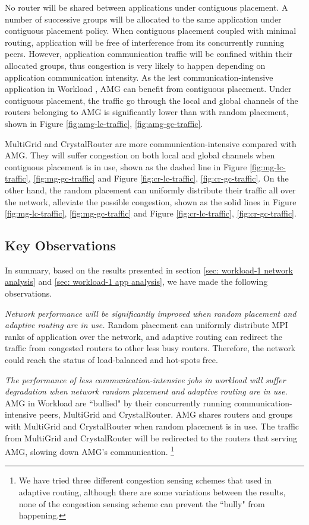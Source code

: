 No router will be shared between applications under contiguous placement. A number of successive groups will be allocated to the same application under contiguous placement policy. When contiguous placement coupled with minimal routing, application will be free of interference from its concurrently running peers. However, application communication traffic will be confined within their allocated groups, thus congestion is very likely to happen depending on application communication intensity. As the lest communication-intensive application in Workload , AMG can benefit from contiguous placement. Under contiguous placement, the traffic go through the local and global channels of the routers belonging to AMG is significantly lower than with random placement, shown in Figure \ref{fig:amg-lc-traffic}, \ref{fig:amg-gc-traffic}. 

MultiGrid and CrystalRouter are more communication-intensive compared with AMG. They will suffer congestion on both local and global channels when contiguous placement is in use, shown as the dashed line in Figure \ref{fig:mg-lc-traffic}, \ref{fig:mg-gc-traffic} and Figure \ref{fig:cr-lc-traffic}, \ref{fig:cr-gc-traffic}. On the other hand, the random placement can uniformly distribute their traffic all over the network, alleviate the possible congestion, shown as the solid lines in Figure \ref{fig:mg-lc-traffic}, \ref{fig:mg-gc-traffic} and Figure \ref{fig:cr-lc-traffic}, \ref{fig:cr-gc-traffic}.


\subsection{Key Observations}
In summary, based on the results presented in section \ref{sec: workload-1 network analysis} and \ref{sec: workload-1 app analysis}, we have made the following observations.


\emph{Network performance will be significantly improved when random placement and adaptive routing are in use.} Random placement can uniformly distribute MPI ranks of application over the network, and adaptive routing can redirect the traffic from congested routers to other less busy routers. Therefore, the network could reach the status of load-balanced and hot-spots free. 

\emph{The performance of less communication-intensive jobs in workload will suffer degradation when network random placement and adaptive routing are in use.} AMG in Workload  are ``bullied" by their concurrently running communication-intensive peers, MultiGrid and CrystalRouter. AMG shares routers and groups with MultiGrid and CrystalRouter when random placement is in use. The traffic from MultiGrid and CrystalRouter will be redirected to the routers that serving AMG, slowing down AMG's communication. \footnote{We have tried three different congestion sensing schemes that used in adaptive routing\cite{won-prog-adaptive}, although there are some variations between the results, none of the congestion sensing scheme can prevent the ``bully" from happening.}

